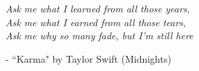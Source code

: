 \begin{center}
    \textit{Ask me what I learned from all those years, \\ Ask me what I earned from all those tears, \\ Ask me why so many fade, but I'm still here}
\end{center}
\begin{flushright}
- ``Karma" by Taylor Swift (Midnights)
\end{flushright}
\restoregeometry